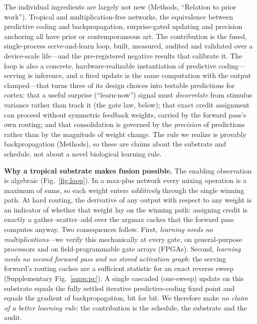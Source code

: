 \documentclass[11pt]{article}
\newcommand{\heading}[1]{\vspace{4pt}\noindent\textbf{#1}\hspace{0.6em}}
\begin{document}
The individual ingredients are largely not new (Methods,
``Relation to prior work''). Tropical and multiplication-free
networks\cite{zhang2018tropical,zhu2024matmulfree,tropicalattention2025,
morpmamba2024}, the equivalence between predictive coding and
backpropagation\cite{rao1999predictive,whittington2017approximation,
song2020can}, surprise-gated updating and precision
anchoring\cite{kirkpatrick2017overcoming} all have prior or contemporaneous
art. The contribution is the fused, single-process serve-and-learn loop,
built, measured, audited and validated over a device-scale life---and the
pre-registered negative results that calibrate it. The loop is also a concrete,
hardware-realizable instantiation of predictive coding---serving is inference,
and a fired update is the same computation with the output clamped---that turns
three of its design choices into testable predictions for cortex: that a useful
surprise (``learn-now'') signal must \emph{decorrelate} from stimulus variance
rather than track it (the gate law, below); that exact credit assignment can proceed
without symmetric feedback weights, carried by the forward pass's own routing;
and that consolidation is governed by the \emph{precision} of predictions rather
than by the magnitude of weight change. The rule we realize is provably
backpropagation (Methods), so these are claims about the substrate and schedule,
not about a novel biological learning rule.

\heading{Why a tropical substrate makes fusion possible.}
The enabling observation is algebraic (Fig.~\ref{fig:loop}). In a max-plus
network every mixing operation is a maximum of sums, so each weight enters
\emph{additively} through the single winning path. At hard routing, the
derivative of any output with respect to any weight is an indicator of whether
that weight lay on the winning path: assigning credit is exactly a
gather--scatter--add over the argmax caches that the forward pass computes
anyway. Two consequences follow. First, \emph{learning needs no
multiplications}---we verify this mechanically at every gate, on
general-purpose processors and on field-programmable gate arrays (FPGAs).
Second, \emph{learning needs no second forward pass and no stored activation
graph}: the serving forward's routing caches are a sufficient statistic for an
exact reverse sweep (Supplementary Fig.~\ref{supp:pc}). A single cascaded
(one-sweep) update on this substrate
equals the fully settled iterative predictive-coding fixed point and equals the
gradient of backpropagation, bit for bit. We therefore make \emph{no claim of a
better learning rule}: the contribution is the schedule, the substrate and the
audit.
\end{document}

